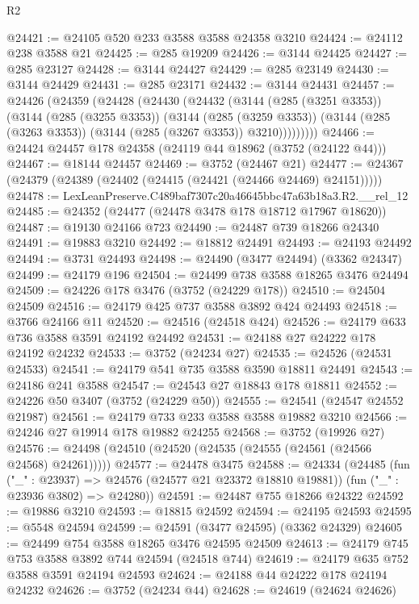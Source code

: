 \begin{lexlean}{R2}
\begin{coremodule}
@24421 := @24105 @520 @233 @3588 @3588 @24358 @3210
@24424 := @24112 @238 @3588 @21
@24425 := @285 @19209
@24426 := @3144 @24425
@24427 := @285 @23127
@24428 := @3144 @24427
@24429 := @285 @23149
@24430 := @3144 @24429
@24431 := @285 @23171
@24432 := @3144 @24431
@24457 := @24426
    (@24359
      (@24428
        (@24430
          (@24432
            (@3144
              (@285 (@3251 @3353))
              (@3144
                (@285 (@3255 @3353))
                (@3144
                  (@285 (@3259 @3353))
                  (@3144 (@285 (@3263 @3353)) (@3144 (@285 (@3267 @3353)) @3210)))))))))
@24466 := @24424 @24457 @178 @24358 (@24119 @44 @18962 (@3752 (@24122 @44)))
@24467 := @18144 @24457
@24469 := @3752 (@24467 @21)
@24477 := @24367 (@24379 (@24389 (@24402 (@24415 (@24421 (@24466 @24469) @24151)))))
@24478 := LexLeanPreserve.C489baf7307c20a46645bbc47a63b18a3.R2.__rel_12
@24485 := @24352 (@24477 (@24478 @3478 @178 @18712 @17967 @18620))
@24487 := @19130 @24166 @723
@24490 := @24487 @739 @18266 @24340
@24491 := @19883 @3210
@24492 := @18812 @24491
@24493 := @24193 @24492
@24494 := @3731 @24493
@24498 := @24490 (@3477 @24494) (@3362 @24347)
@24499 := @24179 @196
@24504 := @24499 @738 @3588 @18265 @3476 @24494
@24509 := @24226 @178 @3476 (@3752 (@24229 @178))
@24510 := @24504 @24509
@24516 := @24179 @425 @737 @3588 @3892 @424 @24493
@24518 := @3766 @24166 @11
@24520 := @24516 (@24518 @424)
@24526 := @24179 @633 @736 @3588 @3591 @24192 @24492
@24531 := @24188 @27 @24222 @178 @24192 @24232
@24533 := @3752 (@24234 @27)
@24535 := @24526 (@24531 @24533)
@24541 := @24179 @541 @735 @3588 @3590 @18811 @24491
@24543 := @24186 @241 @3588
@24547 := @24543 @27 @18843 @178 @18811
@24552 := @24226 @50 @3407 (@3752 (@24229 @50))
@24555 := @24541 (@24547 @24552 @21987)
@24561 := @24179 @733 @233 @3588 @3588 @19882 @3210
@24566 := @24246 @27 @19914 @178 @19882 @24255
@24568 := @3752 (@19926 @27)
@24576 := @24498 (@24510 (@24520 (@24535 (@24555 (@24561 (@24566 @24568) @24261)))))
@24577 := @24478 @3475
@24588 := @24334
    (@24485
      (fun ("_" : @23937) => @24576 (@24577 @21 @23372 @18810 @19881))
      (fun ("_" : @23936 @3802) => @24280))
@24591 := @24487 @755 @18266 @24322
@24592 := @19886 @3210
@24593 := @18815 @24592
@24594 := @24195 @24593
@24595 := @5548 @24594
@24599 := @24591 (@3477 @24595) (@3362 @24329)
@24605 := @24499 @754 @3588 @18265 @3476 @24595 @24509
@24613 := @24179 @745 @753 @3588 @3892 @744 @24594 (@24518 @744)
@24619 := @24179 @635 @752 @3588 @3591 @24194 @24593
@24624 := @24188 @44 @24222 @178 @24194 @24232
@24626 := @3752 (@24234 @44)
@24628 := @24619 (@24624 @24626)

\end{coremodule}
\end{lexlean}
